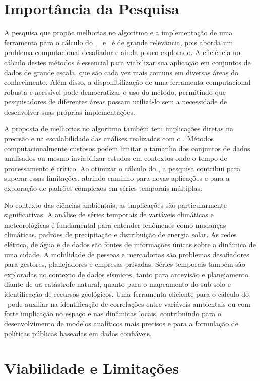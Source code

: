 \section{Importância da Pesquisa}
\label{sec:justificativa}

A pesquisa que propõe melhorias no algoritmo e a implementação de uma ferramenta para o cálculo do \dcca, \pdcca~e \dmc~é de grande relevância, pois aborda um problema computacional desafiador e ainda pouco explorado. A eficiência no cálculo destes métodos é essencial para viabilizar sua aplicação em conjuntos de dados de grande escala, que são cada vez mais comuns em diversas áreas do conhecimento. Além disso, a disponibilização de uma ferramenta computacional robusta e acessível pode democratizar o uso do método, permitindo que pesquisadores de diferentes áreas possam utilizá-lo sem a necessidade de desenvolver suas próprias implementações.

A proposta de melhorias no algoritmo também tem implicações diretas na precisão e na escalabilidade das análises realizadas com o \dmc. Métodos computacionalmente custosos podem limitar o tamanho dos conjuntos de dados analisados ou mesmo inviabilizar estudos em contextos onde o tempo de processamento é crítico. Ao otimizar o cálculo do \dmc, a pesquisa contribui para superar essas limitações, abrindo caminho para novas aplicações e para a exploração de padrões complexos em séries temporais múltiplas.

No contexto das ciências ambientais, as implicações são particularmente significativas. A análise de séries temporais de variáveis climáticas e meteorológicas é fundamental para entender fenômenos como mudanças climáticas, padrões de precipitação e distribuição de energia solar. As redes elétrica, de água e de dados são fontes de informações únicas sobre a dinâmica de uma cidade. A mobilidade de pessoas e mercadorias são problemas desafiadores para gestores, planejadores e empresas privadas. Séries temporais também são exploradas no contexto de dados sísmicos, tanto para antevisão e planejamento diante de ua catástrofe natural, quanto para o mapeamento do sub-solo e identificação de recursos geológicos. Uma ferramenta eficiente para o cálculo do \dmc~pode auxiliar na identificação de correlações entre variáveis ambientais ou com forte implicação no espaço e nas dinâmicas locais, contribuindo para o desenvolvimento de modelos analíticos mais precisos e para a formulação de políticas públicas baseadas em dados confiáveis.

\section{Viabilidade e Limitações}
\label{sec:limites}


